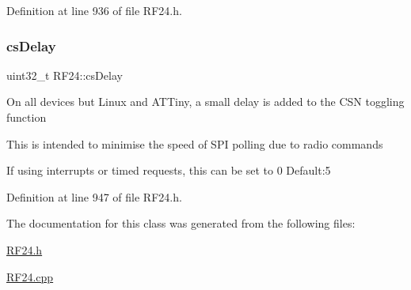 Definition at line 936 of file R\+F24.\+h.

\mbox{\label{classRF24_ad08121bf844f08dbe53f51576b7c4066}} 
\subsubsection{\texorpdfstring{cs\+Delay}{csDelay}}
{\footnotesize\ttfamily uint32\+\_\+t R\+F24\+::cs\+Delay}

On all devices but Linux and A\+T\+Tiny, a small delay is added to the C\+SN toggling function

This is intended to minimise the speed of S\+PI polling due to radio commands

If using interrupts or timed requests, this can be set to 0 Default\+:5 

Definition at line 947 of file R\+F24.\+h.



The documentation for this class was generated from the following files\+:\begin{DoxyCompactItemize}
\item 
\hyperlink{RF24_8h}{R\+F24.\+h}\item 
\hyperlink{RF24_8cpp}{R\+F24.\+cpp}\end{DoxyCompactItemize}
